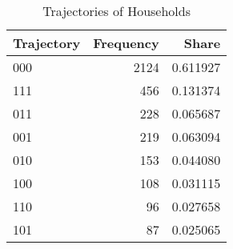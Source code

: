 \begin{table}
\centering
\caption{Trajectories of Households}
\label{tbl:trajectories}
\begin{tabular}{lrr}
\toprule
Trajectory &  Frequency &    Share \\
\midrule
       000 &       2124 & 0.611927 \\
       111 &        456 & 0.131374 \\
       011 &        228 & 0.065687 \\
       001 &        219 & 0.063094 \\
       010 &        153 & 0.044080 \\
       100 &        108 & 0.031115 \\
       110 &         96 & 0.027658 \\
       101 &         87 & 0.025065 \\
\bottomrule
\end{tabular}
\end{table}
